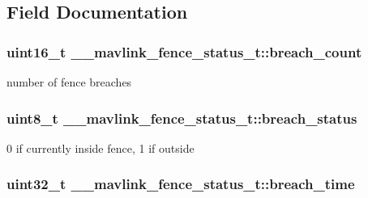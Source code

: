 \subsection{Field Documentation}
\hypertarget{struct____mavlink__fence__status__t_a4a5592dc473ed8cc03668e7fc851ced1}{
\subsubsection[{breach\+\_\+count}]{\setlength{\rightskip}{0pt plus 5cm}uint16\+\_\+t \+\_\+\+\_\+mavlink\+\_\+fence\+\_\+status\+\_\+t\+::breach\+\_\+count}}\label{struct____mavlink__fence__status__t_a4a5592dc473ed8cc03668e7fc851ced1}


number of fence breaches 

\hypertarget{struct____mavlink__fence__status__t_ac4c4d72b7f8364bee6c54721a3f5bcf5}{
\subsubsection[{breach\+\_\+status}]{\setlength{\rightskip}{0pt plus 5cm}uint8\+\_\+t \+\_\+\+\_\+mavlink\+\_\+fence\+\_\+status\+\_\+t\+::breach\+\_\+status}}\label{struct____mavlink__fence__status__t_ac4c4d72b7f8364bee6c54721a3f5bcf5}


0 if currently inside fence, 1 if outside 

\hypertarget{struct____mavlink__fence__status__t_a9ecb570b993e2c9525ff6f6dfd967916}{
\subsubsection[{breach\+\_\+time}]{\setlength{\rightskip}{0pt plus 5cm}uint32\+\_\+t \+\_\+\+\_\+mavlink\+\_\+fence\+\_\+status\+\_\+t\+::breach\+\_\+time}}\label{struct____mavlink__fence__status__t_a9ecb570b993e2c9525ff6f6dfd967916}


